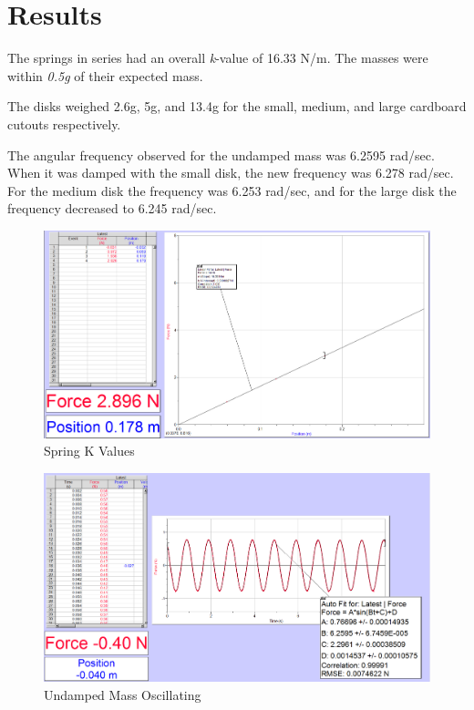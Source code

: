 \documentclass[]{article}
\begin{document}
\section{Results}

The springs in series had an overall \textit{k}-value of 16.33 N/m. The masses were within \textit{0.5g} of their expected mass.

The disks weighed 2.6g, 5g, and 13.4g for the small, medium, and large cardboard cutouts respectively.

The angular frequency observed for the undamped mass was 6.2595 rad/sec. When it was damped with the small disk, the new frequency was 6.278 rad/sec. For the medium disk the frequency was 6.253 rad/sec, and for the large disk the frequency decreased to 6.245 rad/sec.


\begin{figure}[H]
	\centering
	\includegraphics[width=\textwidth]{res/seriesSprings}
	\caption{Spring K Values}
	\label{fig:Spring K Values}
\end{figure}

\begin{figure}[H]
	\centering
	\includegraphics[width=\textwidth]{res/unDamped}
	\caption{Undamped Mass Oscillating}
	\label{fig:Spring K Values}
\end{figure}
\end{document}
